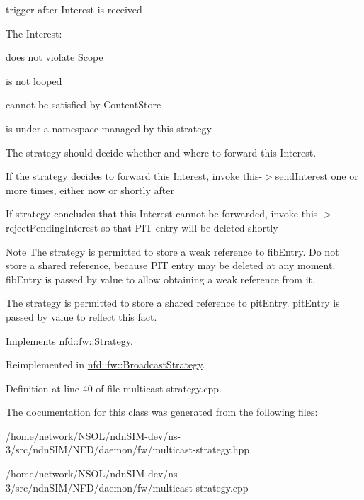 trigger after Interest is received 

The Interest\+:
\begin{DoxyItemize}
\item does not violate Scope
\item is not looped
\item cannot be satisfied by Content\+Store
\item is under a namespace managed by this strategy
\end{DoxyItemize}

The strategy should decide whether and where to forward this Interest.
\begin{DoxyItemize}
\item If the strategy decides to forward this Interest, invoke this-\/$>$send\+Interest one or more times, either now or shortly after
\item If strategy concludes that this Interest cannot be forwarded, invoke this-\/$>$reject\+Pending\+Interest so that P\+IT entry will be deleted shortly
\end{DoxyItemize}

\begin{DoxyNote}{Note}
The strategy is permitted to store a weak reference to fib\+Entry. Do not store a shared reference, because P\+IT entry may be deleted at any moment. fib\+Entry is passed by value to allow obtaining a weak reference from it. 

The strategy is permitted to store a shared reference to pit\+Entry. pit\+Entry is passed by value to reflect this fact. 
\end{DoxyNote}


Implements \hyperlink{classnfd_1_1fw_1_1Strategy_a1193c1881f92b1618a1004f92669eaaa}{nfd\+::fw\+::\+Strategy}.



Reimplemented in \hyperlink{classnfd_1_1fw_1_1BroadcastStrategy_a08823b7058a224203f7ddc3c32203e50}{nfd\+::fw\+::\+Broadcast\+Strategy}.



Definition at line 40 of file multicast-\/strategy.\+cpp.



The documentation for this class was generated from the following files\+:\begin{DoxyCompactItemize}
\item 
/home/network/\+N\+S\+O\+L/ndn\+S\+I\+M-\/dev/ns-\/3/src/ndn\+S\+I\+M/\+N\+F\+D/daemon/fw/multicast-\/strategy.\+hpp\item 
/home/network/\+N\+S\+O\+L/ndn\+S\+I\+M-\/dev/ns-\/3/src/ndn\+S\+I\+M/\+N\+F\+D/daemon/fw/multicast-\/strategy.\+cpp\end{DoxyCompactItemize}
